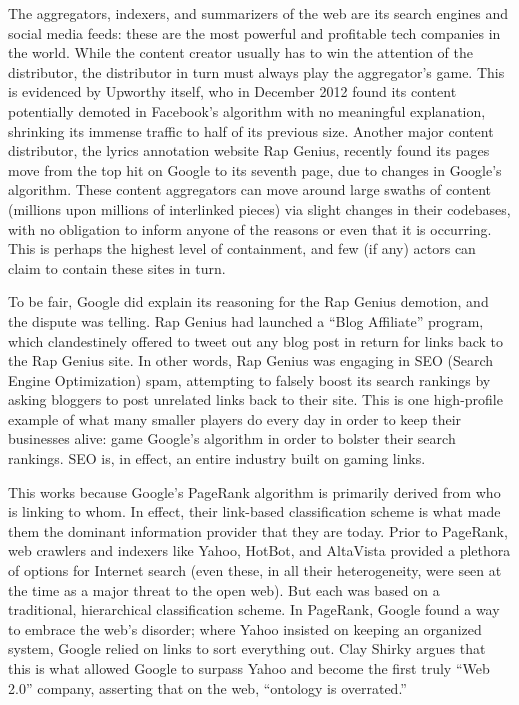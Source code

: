 The aggregators, indexers, and summarizers of the web are its search engines and social media feeds: these are the most powerful and profitable tech companies in the world. While the content creator usually has to win the attention of the distributor, the distributor in turn must always play the aggregator's game. This is evidenced by Upworthy itself, who in December 2012 found its content potentially demoted in Facebook's algorithm with no meaningful explanation, shrinking its immense traffic to half of its previous size.\autocite{upworthy -- check this date} Another major content distributor, the lyrics annotation website Rap Genius, recently found its pages move from the top hit on Google to its seventh page, due to changes in Google's algorithm.  These content aggregators can move around large swaths of content (millions upon millions of interlinked pieces) via slight changes in their codebases, with no obligation to inform anyone of the reasons or even that it is occurring. This is perhaps the highest level of containment, and few (if any) actors can claim to contain these sites in turn.

To be fair, Google did explain its reasoning for the Rap Genius demotion, and the dispute was telling. Rap Genius had launched a ``Blog Affiliate'' program, which clandestinely offered to tweet out any blog post in return for links back to the Rap Genius site. In other words, Rap Genius was engaging in SEO (Search Engine Optimization) spam, attempting to falsely boost its search rankings by asking bloggers to post unrelated links back to their site. This is one high-profile example of what many smaller players do every day in order to keep their businesses alive: game Google's algorithm in order to bolster their search rankings. SEO is, in effect, an entire industry built on gaming links.

This works because Google's PageRank algorithm is primarily derived from who is linking to whom. In effect, their link-based classification scheme is what made them the dominant information provider that they are today. Prior to PageRank, web crawlers and indexers like Yahoo, HotBot, and AltaVista provided a plethora of options for Internet search (even these, in all their heterogeneity, were seen at the time as a major threat to the open web). But each was based on a traditional, hierarchical classification scheme. In PageRank, Google found a way to embrace the web's disorder; where Yahoo insisted on keeping an organized system, Google relied on links to sort everything out. Clay Shirky argues that this is what allowed Google to surpass Yahoo and become the first truly ``Web 2.0'' company, asserting that on the web, ``ontology is overrated.'' 

